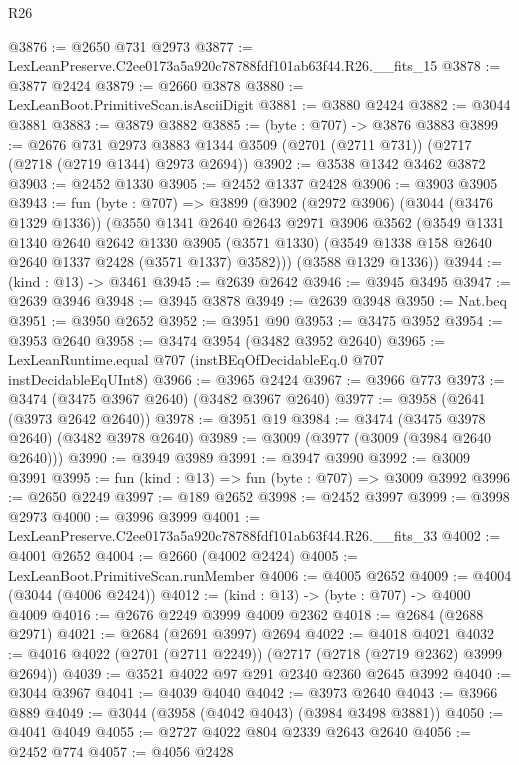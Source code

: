\begin{lexlean}{R26}
\begin{coremodule}
@3876 := @2650 @731 @2973
@3877 := LexLeanPreserve.C2ee0173a5a920c78788fdf101ab63f44.R26.__fits_15
@3878 := @3877 @2424
@3879 := @2660 @3878
@3880 := LexLeanBoot.PrimitiveScan.isAsciiDigit
@3881 := @3880 @2424
@3882 := @3044 @3881
@3883 := @3879 @3882
@3885 := (byte : @707) -> @3876 @3883
@3899 := @2676
    @731
    @2973
    @3883
    @1344
    @3509
    (@2701 (@2711 @731))
    (@2717 (@2718 (@2719 @1344) @2973 @2694))
@3902 := @3538 @1342 @3462 @3872
@3903 := @2452 @1330
@3905 := @2452 @1337 @2428
@3906 := @3903 @3905
@3943 := fun (byte : @707) =>
  @3899
    (@3902
      (@2972 @3906)
      (@3044 (@3476 @1329 @1336))
      (@3550
        @1341
        @2640
        @2643
        @2971
        @3906
        @3562
        (@3549
          @1331
          @1340
          @2640
          @2642
          @1330
          @3905
          (@3571 @1330)
          (@3549 @1338 @158 @2640 @2640 @1337 @2428 (@3571 @1337) @3582)))
      (@3588 @1329 @1336))
@3944 := (kind : @13) -> @3461
@3945 := @2639 @2642
@3946 := @3945 @3495
@3947 := @2639 @3946
@3948 := @3945 @3878
@3949 := @2639 @3948
@3950 := Nat.beq
@3951 := @3950 @2652
@3952 := @3951 @90
@3953 := @3475 @3952
@3954 := @3953 @2640
@3958 := @3474 @3954 (@3482 @3952 @2640)
@3965 := LexLeanRuntime.equal @707 (instBEqOfDecidableEq.{0} @707 instDecidableEqUInt8)
@3966 := @3965 @2424
@3967 := @3966 @773
@3973 := @3474 (@3475 @3967 @2640) (@3482 @3967 @2640)
@3977 := @3958 (@2641 (@3973 @2642 @2640))
@3978 := @3951 @19
@3984 := @3474 (@3475 @3978 @2640) (@3482 @3978 @2640)
@3989 := @3009 (@3977 (@3009 (@3984 @2640 @2640)))
@3990 := @3949 @3989
@3991 := @3947 @3990
@3992 := @3009 @3991
@3995 := fun (kind : @13) => fun (byte : @707) => @3009 @3992
@3996 := @2650 @2249
@3997 := @189 @2652
@3998 := @2452 @3997
@3999 := @3998 @2973
@4000 := @3996 @3999
@4001 := LexLeanPreserve.C2ee0173a5a920c78788fdf101ab63f44.R26.__fits_33
@4002 := @4001 @2652
@4004 := @2660 (@4002 @2424)
@4005 := LexLeanBoot.PrimitiveScan.runMember
@4006 := @4005 @2652
@4009 := @4004 (@3044 (@4006 @2424))
@4012 := (kind : @13) -> (byte : @707) -> @4000 @4009
@4016 := @2676 @2249 @3999 @4009 @2362
@4018 := @2684 (@2688 @2971)
@4021 := @2684 (@2691 @3997) @2694
@4022 := @4018 @4021
@4032 := @4016 @4022 (@2701 (@2711 @2249)) (@2717 (@2718 (@2719 @2362) @3999 @2694))
@4039 := @3521 @4022 @97 @291 @2340 @2360 @2645 @3992
@4040 := @3044 @3967
@4041 := @4039 @4040
@4042 := @3973 @2640
@4043 := @3966 @889
@4049 := @3044 (@3958 (@4042 @4043) (@3984 @3498 @3881))
@4050 := @4041 @4049
@4055 := @2727 @4022 @804 @2339 @2643 @2640
@4056 := @2452 @774
@4057 := @4056 @2428

\end{coremodule}
\end{lexlean}
